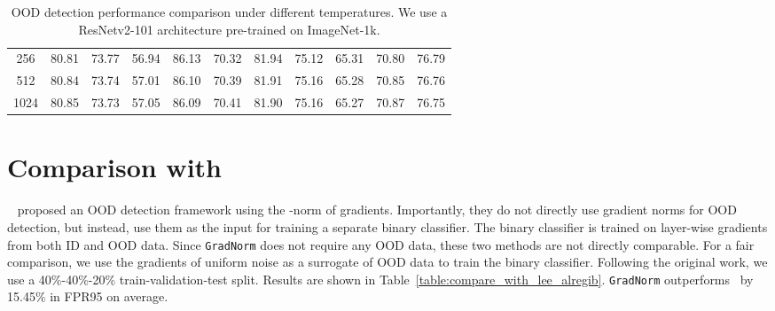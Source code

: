 \documentclass{article}
\begin{document}
\begin{table}[h]
{\begin{tabular}{c|C{0.04\textwidth}C{0.05\textwidth}|C{0.04\textwidth}C{0.05\textwidth}|C{0.04\textwidth}C{0.05\textwidth}|C{0.04\textwidth}C{0.05\textwidth}|C{0.04\textwidth}C{0.05\textwidth}}
256                                   & 80.81                & 73.77                 & 56.94                & 86.13                 & 70.32                & 81.94                 & 75.12                & 65.31                 & 70.80                & 76.79                \\
512                                   & 80.84                & 73.74                 & 57.01                & 86.10                 & 70.39                & 81.91                 & 75.16                & 65.28                 & 70.85                & 76.76                \\
1024                                  & 80.85                & 73.73                 & 57.05                & 86.09                 & 70.41                & 81.90                 & 75.16                & 65.27                 & 70.87                & 76.75                \\ \bottomrule
\end{tabular}
}
    \caption{OOD detection performance comparison under different temperatures. We use a ResNetv2-101 architecture pre-trained on ImageNet-1k.}
    \label{tab:more_temper}
\end{table}

\section{Comparison with \citeauthor{lee2020gradients}}
\label{app:comparison_with_la}

\citeauthor{lee2020gradients}~\cite{lee2020gradients} proposed an OOD detection framework using the -norm of gradients. Importantly, they do not directly use gradient norms for OOD detection, but instead, use them as the input for training a separate binary classifier. The binary classifier is trained on layer-wise gradients from both ID and OOD data. Since \texttt{GradNorm} does not require any OOD data, these two methods are not directly comparable. For a fair comparison, we use the gradients of uniform noise as a surrogate of OOD data to train the binary classifier. Following the original work, we use a 40\%-40\%-20\% train-validation-test split. 
Results are shown in Table~\ref{table:compare_with_lee_alregib}. \texttt{GradNorm} outperforms~\cite{lee2020gradients} by 15.45\% in FPR95 on average.
\end{document}
